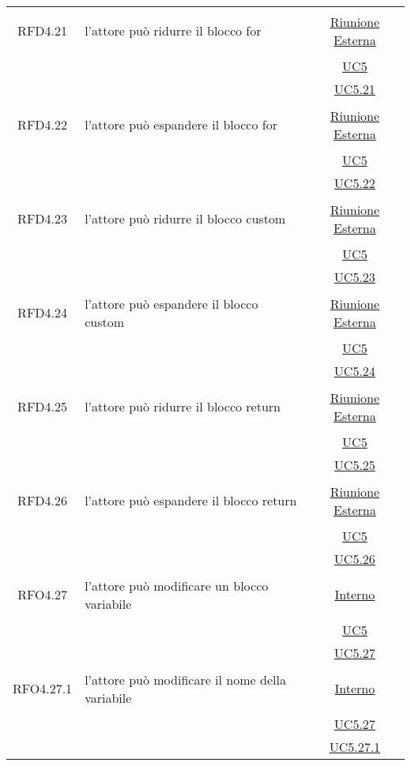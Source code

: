 \begin{longtable}{|c|>{\centering}m{7cm}|c|}
\hypertarget{RFD4.21}{RFD4.21} & l'attore può ridurre il blocco for & \hyperlink{Riunione Esterna}{Riunione Esterna}\\
& &\hyperref[UC5]{UC5}\\
& & \hyperref[UC5.21]{UC5.21}\\ \hline

\hypertarget{RFD4.22}{RFD4.22} & l'attore può espandere il blocco for &  \hyperlink{Riunione Esterna}{Riunione Esterna}\\
& &\hyperref[UC5]{UC5}\\
& &\hyperref[UC5.22]{UC5.22}\\ \hline

\hypertarget{RFD4.23}{RFD4.23} & l'attore può ridurre il blocco custom & \hyperlink{Riunione Esterna}{Riunione Esterna}\\
& &\hyperref[UC5]{UC5}\\
& & \hyperref[UC5.23]{UC5.23}\\ \hline

\hypertarget{RFD4.24}{RFD4.24} & l'attore può espandere il blocco custom &  \hyperlink{Riunione Esterna}{Riunione Esterna}\\
& &\hyperref[UC5]{UC5}\\
& &\hyperref[UC5.24]{UC5.24}\\ \hline

\hypertarget{RFD4.25}{RFD4.25} & l'attore può ridurre il blocco return & \hyperlink{Riunione Esterna}{Riunione Esterna}\\
& &\hyperref[UC5]{UC5}\\
& & \hyperref[UC5.25]{UC5.25}\\ \hline

\hypertarget{RFD4.26}{RFD4.26} & l'attore può espandere il blocco return &  \hyperlink{Riunione Esterna}{Riunione Esterna}\\
& &\hyperref[UC5]{UC5}\\
& &\hyperref[UC5.26]{UC5.26}\\ \hline

\hypertarget{RFO4.27}{RFO4.27} & l'attore può modificare un blocco variabile &  \hyperlink{Interno}{Interno}\\
& &\hyperref[UC5]{UC5}\\
& &\hyperref[UC5.27]{UC5.27}\\ \hline

\hypertarget{RFO4.27.1}{RFO4.27.1} & l'attore può modificare il nome della variabile & \hyperlink{Interno}{Interno}\\
& &\hyperref[UC5.27]{UC5.27}\\
& &\hyperref[UC5.27.1]{UC5.27.1}\\ \hline


\end{longtable}
